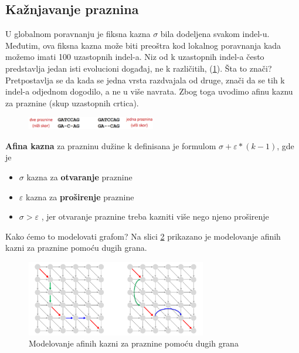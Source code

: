 \subsection{Kažnjavanje praznina}

U globalnom poravnanju je fiksna kazna $\sigma$ bila dodeljena svakom indel-u. Međutim, ova fiksna kazna može biti preoštra kod lokalnog poravnanja kada možemo imati 100 uzastopnih indel-a. Niz od k uzastopnih indel-a često predstavlja jedan isti evolucioni događaj, ne k različitih, (\ref{slika:kaznjavanje}). Šta to znači? Pretpostavlja se da kada se jedna vrsta razdvajala od druge, znači da se tih k indel-a odjednom dogodilo, a ne u više navrata. Zbog toga uvodimo afinu kaznu za praznine (skup uzastopnih crtica).

\begin{figure}[h]
\centering
\includegraphics[width=0.5\textwidth]{poglavlja/5/slike/kaznjavanjePraznina.png}
\caption{}
\label{slika:kaznjavanje}
\end{figure}


\textbf{Afina kazna} za prazninu dužine k definisana je formulom $\sigma+\varepsilon*(k-1)$, gde je 
\begin{itemize}
    \item $\sigma$ kazna za \textbf{otvaranje} praznine
    \item $\varepsilon$ kazna za \textbf{proširenje} praznine
    \item $ \sigma > \varepsilon$ , jer otvaranje praznine treba kazniti više nego njeno proširenje
\end{itemize}

Kako ćemo to modelovati grafom? Na slici \ref{slika:modelovanje} prikazano je modelovanje afinih kazni za praznine pomoću dugih grana.

\begin{figure}[h!]
\centering
\includegraphics[width=0.7\textwidth]{poglavlja/5/slike/modelovanjePomocuDugihGrana.png}
\caption{Modelovanje afinih kazni za praznine pomoću dugih grana}
\label{slika:modelovanje}
\end{figure}

